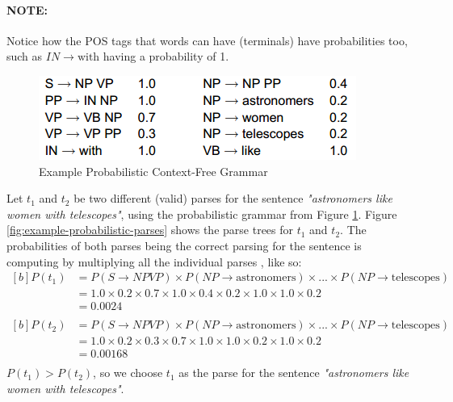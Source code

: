 \documentclass{article}
\begin{document}
\paragraph{\textbf{NOTE: }} Notice how the POS tags that words can have (terminals) have probabilities too, such as $IN \rightarrow \text{with}$ having a probability of 1.

\begin{figure}
	\centering
	\includegraphics[scale=0.7]{figures/probabilistic-grammar-example.png}
	\caption{Example Probabilistic Context-Free Grammar}
	\label{fig:probabilistic-grammar}
\end{figure}

Let $t_1$ and $t_2$ be two different (valid) parses for the sentence \textit{"astronomers like women with telescopes"}, using the probabilistic grammar from Figure \ref{fig:probabilistic-grammar}. Figure \ref{fig:example-probabilistic-parses} shows the parse trees for $t_1$ and $t_2$. The probabilities of both parses being the correct parsing for the sentence is computing by multiplying all the individual parses , like so:
\begin{equation}
\begin{aligned}[b]
	P(t_1) &= P(S \rightarrow NP VP) \times P(NP \rightarrow \text{astronomers}) \times ... \times P(NP \rightarrow \text{telescopes})  \\
	 &= 1.0 \times 0.2 \times 0.7 \times 1.0 \times 0.4 \times 0.2 \times 1.0 \times 1.0 \times 0.2 \\
	&= 0.0024 \\
\end{aligned}
\end{equation}
\begin{equation}
\begin{aligned}[b]
	P(t_2) &= P(S \rightarrow NP VP) \times P(NP \rightarrow \text{astronomers}) \times ... \times P(NP \rightarrow \text{telescopes})  \\
	 &= 1.0 \times 0.2 \times 0.3 \times 0.7 \times 1.0 \times 1.0 \times 0.2 \times 1.0 \times 0.2 \\
	&= 0.00168 \\
\end{aligned}
\end{equation}
$P(t_1) > P(t_2)$, so we choose $t_1$ as the parse for the sentence \textit{"astronomers like women with telescopes"}.
\end{document}
